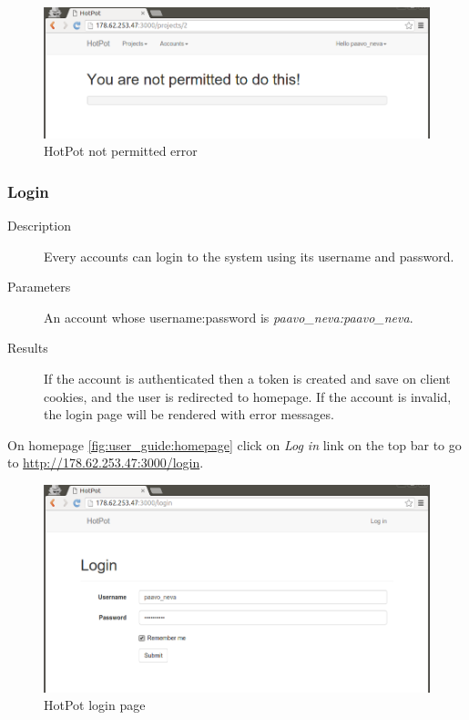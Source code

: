 \begin{figure}[bth]                                                                                                                                                  \myfloatalign
\includegraphics[width=1.0\linewidth]{gfx/chapter_5/general/not_permitted}
\caption[HotPot not permitted error]{HotPot not permitted error}
\label{fig:user_guide:not_permitted}
\end{figure}

\clearpage

\subsubsection{Login}
\label{ch:result:user_guide:miscellaneous:login}

\begin{description}
\item[Description] Every accounts can login to the system using its username and password.
\item[Parameters] An account whose username:password is \emph{paavo\_neva:paavo\_neva}.
\item[Results] If the account is authenticated then a token is created and save on client cookies, and the user is redirected to homepage.
If the account is invalid, the login page will be rendered with error messages.
\end{description}

On homepage \autoref{fig:user_guide:homepage} click on \emph{Log in} link on the top bar to go to \href{http://178.62.253.47:3000/login}{http://178.62.253.47:3000/login}.

\begin{figure}[bth]                                                                                                                                                  \myfloatalign
\includegraphics[width=1.0\linewidth]{gfx/chapter_5/miscellaneous/login}
\caption[HotPot login page]{HotPot login page}
\label{fig:user_guide:miscellaneous:login}
\end{figure}

